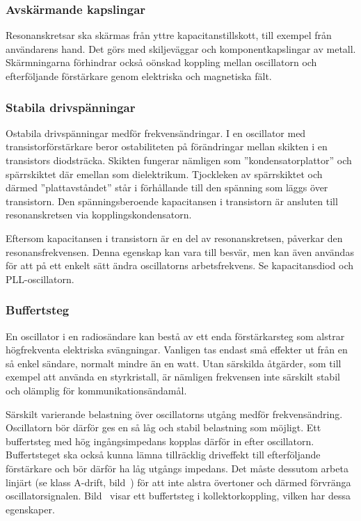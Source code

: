 \subsubsection{Avskärmande kapslingar}

Resonanskretsar ska skärmas från yttre kapacitanstillskott, till exempel från
användarens hand.
Det görs med skiljeväggar och komponentkapslingar av metall.
Skärmningarna förhindrar också oönskad koppling mellan oscillatorn och
efterföljande förstärkare genom elektriska och magnetiska fält.

\subsubsection{Stabila drivspänningar}

Ostabila drivspänningar medför frekvensändringar.
I en oscillator med transistorförstärkare beror ostabiliteten på förändringar
mellan skikten i en transistors diodsträcka.
Skikten fungerar nämligen som ''kondensatorplattor'' och spärrskiktet där
emellan som dielektrikum.
Tjockleken av spärrskiktet och därmed ''plattavståndet'' står i förhållande
till den spänning som läggs över transistorn.
Den spänningsberoende kapacitansen i transistorn är ansluten till
resonanskretsen via kopplingskondensatorn.

Eftersom kapacitansen i transistorn är en del av resonanskretsen, påverkar
den resonansfrekvensen.
Denna egenskap kan vara till besvär, men kan även användas för att på ett
enkelt sätt ändra oscillatorns arbetsfrekvens.
Se kapacitansdiod och PLL-oscillatorn.

\subsubsection{Buffertsteg}
\label{buffertsteg}

En oscillator i en radiosändare kan bestå av ett enda förstärkarsteg
som alstrar högfrekventa elektriska svängningar.
Vanligen tas endast små effekter ut från en så enkel sändare, normalt mindre än
en watt.
Utan särskilda åtgärder, som till exempel att använda en styrkristall, är
nämligen frekvensen inte särskilt stabil och olämplig för kommunikationsändamål.

Särskilt varierande belastning över oscillatorns utgång medför frekvensändring.
Oscillatorn bör därför ges en så låg och stabil belastning som möjligt.
Ett buffertsteg med hög ingångsimpedans kopplas därför in efter oscillatorn.
Buffertsteget ska också kunna lämna tillräcklig driveffekt till efterföljande 
förstärkare och bör därför ha låg utgångs impedans.
Det måste dessutom arbeta linjärt (se klass A-drift, bild~)
för att inte alstra övertoner och därmed förvränga oscillatorsignalen.
Bild~ visar ett buffertsteg i kollektorkoppling, vilken har
dessa egenskaper.

